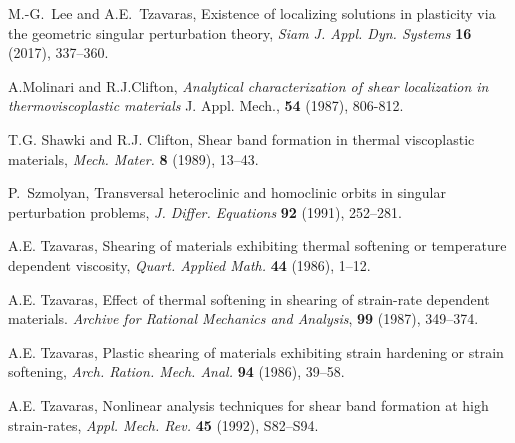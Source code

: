 \documentclass[usletter,11pt]{article}
\theoremstyle{remark}
\begin{document}
\begin{thebibliography}{10}
{\sc M.-G.~Lee and A.E.~Tzavaras},
Existence of localizing solutions in plasticity via the geometric singular perturbation theory,
{\it Siam J. Appl. Dyn. Systems} {\bf 16} (2017), 337--360.


{\sc A.Molinari and R.J.Clifton},
{\sl Analytical characterization of shear localization in thermoviscoplastic materials}
 J. Appl. Mech.,  {\bf 54} (1987), 806-812.

%
%
%

%
%

{\sc T.G. Shawki and R.J. Clifton},
Shear band formation in thermal viscoplastic materials,
{\it Mech. Mater.}
{\bf 8 } (1989), 13--43.

{\sc P.~Szmolyan},
Transversal heteroclinic and homoclinic orbits in singular perturbation problems,
{\it J. Differ. Equations}
{\bf 92} (1991), 252--281.

{\sc A.E. Tzavaras},
Shearing of materials exhibiting thermal softening or temperature dependent viscosity,
{\em Quart.  Applied Math.} {\bf 44} (1986), 1--12.

{\sc A.E. Tzavaras},
Effect of thermal softening in shearing of strain-rate dependent materials.
{\em Archive for Rational Mechanics and Analysis}, {\bf 99} (1987), 349--374.

{\sc A.E. Tzavaras},
Plastic shearing of materials exhibiting strain hardening or strain softening,
{\it Arch. Ration. Mech. Anal.}
{\bf 94} (1986), 39--58.


{\sc A.E. Tzavaras},
Nonlinear analysis techniques for shear band formation at high strain-rates,
{\it Appl. Mech. Rev.}
{\bf  45} (1992), S82--S94.




\end{thebibliography}
\end{document}
